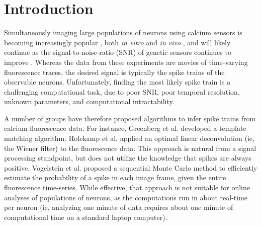 \section{Introduction}


Simultaneously imaging large populations of neurons using calcium sensors is becoming increasingly popular \cite{ImagingManual}, both \emph{in vitro} \cite{SmettersYuste99, IkegayaYuste04} and \emph{in vivo} \cite{NagayamaChen07, GobelHelmchen07, LuoSvoboda08}, and will likely continue as the signal-to-noise-ratio (SNR) of genetic sensors continues to improve \cite{GaraschukKonnerth07, MankGriesbeck08b, WallaceHasan08}. 
Whereas the data from these experiments are movies of time-varying fluorescence traces, the desired signal is typically the spike trains of the observable neurons. Unfortunately, finding the most likely spike train is a challenging computational task, due to poor SNR, poor temporal resolution, unknown parameters, and computational intractability. %

A number of groups have therefore proposed algorithms to infer spike trains from calcium fluorescence data.  For instance, Greenberg et al. \cite{GreenbergKerr08} developed a  template matching algorithm. %
Holekamp et al. \cite{HolekampHoly08} applied an optimal linear deconvolution (ie, the Wiener filter) to the fluorescence data.  This approach is natural from a signal processing standpoint, but does not utilize the knowledge that spikes are always positive.  Vogelstein et al. \cite{VogelsteinPaninski09} proposed a sequential Monte Carlo method to efficiently estimate the probability of a spike in each image frame, given the entire fluorescence time-series.  While effective, that approach is not suitable for online analyses of populations of neurons, as the computations run in about real-time per neuron (ie, analyzing one minute of data requires about one minute of computational time on a standard laptop computer).

